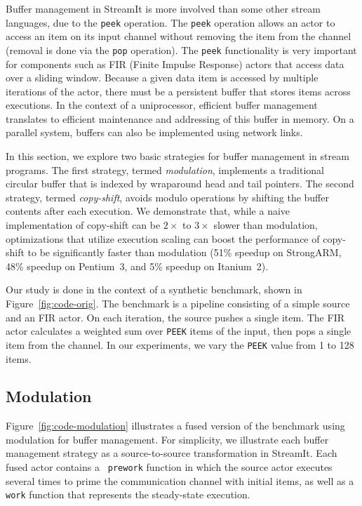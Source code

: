 Buffer management in StreamIt is more involved than some other stream
languages, due to the {\tt peek} operation.  The {\tt peek} operation
allows an actor to access an item on its input channel without
removing the item from the channel (removal is done via the {\tt pop}
operation).  The {\tt peek} functionality is very important for
components such as FIR (Finite Impulse Response) actors that access
data over a sliding window.  Because a given data item is accessed by
multiple iterations of the actor, there must be a persistent buffer
that stores items across executions.  In the context of a
uniprocessor, efficient buffer management translates to efficient
maintenance and addressing of this buffer in memory.  On a parallel
system, buffers can also be implemented using network links.

In this section, we explore two basic strategies for buffer management
in stream programs.  The first strategy, termed {\it modulation},
implements a traditional circular buffer that is indexed by wraparound
head and tail pointers.  The second strategy, termed {\it copy-shift},
avoids modulo operations by shifting the buffer contents after each
execution.  We demonstrate that, while a naive implementation of
copy-shift can be $2\times$ to $3\times$ slower than modulation, optimizations that
utilize execution scaling can boost the performance of copy-shift to
be significantly faster than modulation (51\% speedup on StrongARM,
48\% speedup on Pentium~3, and 5\% speedup on Itanium~2).



Our study is done in the context of a synthetic benchmark, shown in
Figure~\ref{fig:code-orig}.  
The benchmark is a pipeline consisting of a simple source and an FIR
actor.  On each iteration, the source pushes a single item.  The FIR
actor calculates a weighted sum over {\tt PEEK} items of the input,
then pops a single item from the channel.  In our experiments, we vary
the {\tt PEEK} value from 1 to 128 items.



\subsection{Modulation}

Figure~\ref{fig:code-modulation} illustrates a fused version of the
benchmark using modulation for buffer management.  For simplicity, we
illustrate each buffer management strategy as a source-to-source
transformation in StreamIt.  Each fused actor contains a {\tt
prework} function in which the source actor executes several times to
prime the communication channel with initial items, as well as a {\tt
work} function that represents the steady-state execution.

